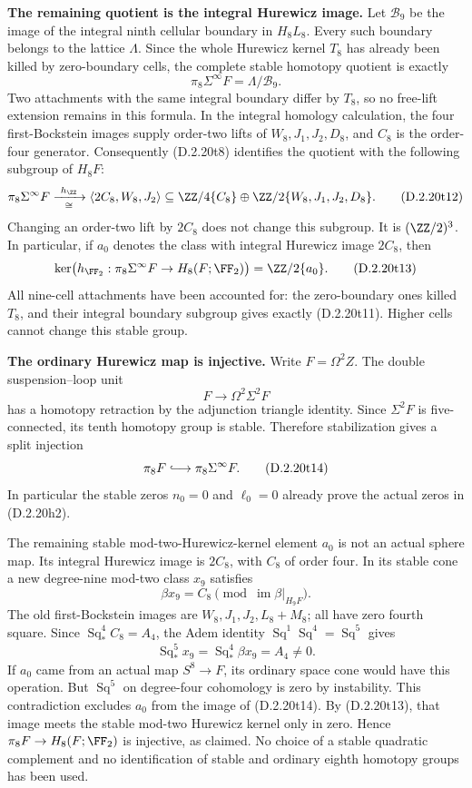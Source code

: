 \medskip\noindent
\textbf{The remaining quotient is the integral Hurewicz image.}
Let $\mathcal B_9$ be the image of the integral ninth
cellular boundary in $H_8L_8$. Every such boundary belongs
to the lattice $\Lambda$. Since the whole Hurewicz kernel
$T_8$ has already been killed by zero-boundary cells,
the complete stable homotopy quotient is exactly
\[
 \pi_8\Sigma^\infty F=\Lambda/\mathcal B_9.
 \tag{D.2.20t11}
\]
Two attachments with the same integral boundary differ
by $T_8$, so no free-lift extension remains in this formula.
In the integral homology calculation, the four
first-Bockstein images supply order-two lifts of
$W_8,J_1,J_2,D_8$, and $C_8$ is the order-four generator.
Consequently \textup{(D.2.20t8)} identifies the quotient
with the following subgroup of $H_8F$:
\[
 \pi_8\Sigma^\infty F
 \xrightarrow[\cong]{\ h_{\ZZ}\ }
 \langle2C_8,W_8,J_2\rangle
       \subseteq\ZZ/4\{C_8\}\oplus
           \ZZ/2\{W_8,J_1,J_2,D_8\}.
 \tag{D.2.20t12}
\]
Changing an order-two lift by $2C_8$ does not change
this subgroup. It is $(\ZZ/2)^3$. In particular, if
$a_0$ denotes the class with integral Hurewicz image
$2C_8$, then
\[
 \ker\bigl(h_{\FF_2}:\pi_8\Sigma^\infty F
                     \to H_8(F;\FF_2)\bigr)
       =\ZZ/2\{a_0\}.
 \tag{D.2.20t13}
\]
All nine-cell attachments have been accounted for:
the zero-boundary ones killed $T_8$, and their integral
boundary subgroup gives exactly \textup{(D.2.20t11)}.
Higher cells cannot change this stable group.

\medskip\noindent
\textbf{The ordinary Hurewicz map is injective.}
Write $F=\Omega^2 Z$. The double suspension--loop unit
\[
 F\longrightarrow\Omega^2\Sigma^2F
\]
has a homotopy retraction by the adjunction triangle
identity. Since $\Sigma^2F$ is five-connected, its
tenth homotopy group is stable. Therefore stabilization
gives a split injection
\[
 \pi_8F\lhook\joinrel\longrightarrow\pi_8\Sigma^\infty F.
 \tag{D.2.20t14}
\]
In particular the stable zeros $n_0=0$ and $\ell_0=0$
already prove the actual zeros in \textup{(D.2.20h2)}.

The remaining stable mod-two-Hurewicz-kernel element
$a_0$ is not an actual sphere map. Its integral
Hurewicz image is $2C_8$, with $C_8$ of order four.
In its stable cone a new degree-nine mod-two class $x_9$
satisfies
\[
 \beta x_9=C_8\pmod{\operatorname{im}\beta|_{H_9F}}.
\]
The old first-Bockstein images are
$W_8,J_1,J_2,L_8+M_8$; all have zero fourth square.
Since $\operatorname{Sq}_*^4C_8=A_4$, the Adem identity
$\operatorname{Sq}^1\operatorname{Sq}^4
=\operatorname{Sq}^5$ gives
\[
 \operatorname{Sq}_*^5x_9
   =\operatorname{Sq}_*^4\beta x_9=A_4\ne0.
 \tag{D.2.20t15}
\]
If $a_0$ came from an actual map $S^8\to F$, its
ordinary space cone would have this operation.
But $\operatorname{Sq}^5$ on degree-four cohomology
is zero by instability. This contradiction excludes
$a_0$ from the image of \textup{(D.2.20t14)}.
By \textup{(D.2.20t13)}, that image meets the stable
mod-two Hurewicz kernel only in zero. Hence
$\pi_8F\to H_8(F;\FF_2)$ is injective, as claimed.
No choice of a stable quadratic complement and no
identification of stable and ordinary eighth homotopy
groups has been used.

